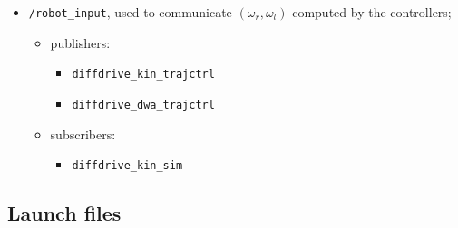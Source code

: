 \documentclass[11pt,a4paper]{article}
\begin{document}
\begin{itemize}
    \item \texttt{/robot\_input}, used to communicate $(\omega_r,\omega_l)$ computed by the controllers;
        \begin{itemize}
            \item publishers:
                \begin{itemize}
                    \item \texttt{diffdrive\_kin\_trajctrl}
                    \item \texttt{diffdrive\_dwa\_trajctrl}
                \end{itemize}
            \item subscribers:
                \begin{itemize}
                    \item \texttt{diffdrive\_kin\_sim}
                \end{itemize}
        \end{itemize}

\end{itemize}

\subsection{Launch files}
\end{document}
